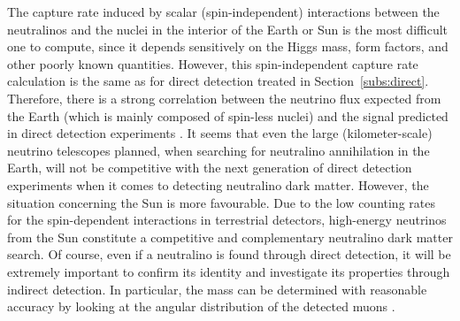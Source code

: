 The capture rate induced by scalar (spin-independent) interactions
between the neutralinos and the nuclei in the interior of the Earth or
Sun is the most difficult one to compute, since it depends sensitively
on the Higgs mass, form factors, and other poorly known quantities.
However, this spin-independent capture rate calculation is the same as
for direct detection treated in Section~\ref{subs:direct}.  Therefore,
there is a strong correlation between the neutrino flux expected from
the Earth (which is mainly composed of spin-less nuclei) and the
signal predicted in direct detection experiments \cite{begnu2,kamsad}.
It seems that even the large (kilometer-scale) neutrino telescopes
planned, when searching for neutralino annihilation in the Earth, will
not be competitive with the next generation of direct detection
experiments when it comes to detecting neutralino dark matter.
However, the situation concerning the Sun is more favourable.  Due to
the low counting rates for the spin-dependent interactions in
terrestrial detectors, high-energy neutrinos from the Sun constitute a
competitive and complementary neutralino dark matter search.  Of
course, even if a neutralino is found through direct detection, it
will be extremely important to confirm its identity and investigate
its properties through indirect detection.  In particular, the mass
can be determined with reasonable accuracy by looking at the angular
distribution of the detected muons \cite{EG,BEK}.

